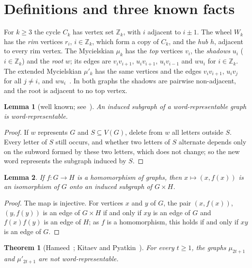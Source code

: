 \documentclass[11pt]{article}
\newtheorem{theorem}{Theorem}
\newtheorem{lemma}{Lemma}[section]
\theoremstyle{remark}
\newcommand{\Z}{\mathbb Z}
\begin{document}
\section{Definitions and three known facts}\label{sec:defs}
For $k\ge3$ the cycle $C_k$ has vertex set $\Z_k$, with $i$ adjacent to
$i\pm1$. The wheel $W_k$ has the \emph{rim} vertices $r_i$, $i\in\Z_k$,
which form a copy of $C_k$, and the \emph{hub} $h$, adjacent to every rim
vertex. The Mycielskian $\mu_k$ has the \emph{top} vertices $v_i$, the
\emph{shadows} $u_i$ ($i\in\Z_k$) and the \emph{root} $w$; its edges are
$v_iv_{i+1}$, $u_iv_{i+1}$, $u_iv_{i-1}$ and $wu_i$ for $i\in\Z_k$. The
extended Mycielskian $\mu'_k$ has the same vertices and the edges $v_iv_{i+1}$,
$u_iv_j$ for all $j\ne i$, and $wu_i$~\cite{alsh,kp}. In both graphs the
shadows are pairwise non-adjacent, and the root is adjacent to no top vertex.

\begin{lemma}[{well known; see~\cite{kl}}]\label{lem:hered}
An induced subgraph of a word-representable graph is word-representable.
\end{lemma}
\begin{proof}
If $w$ represents $G$ and $S\subseteq V(G)$, delete from $w$ all letters
outside $S$. Every letter of $S$ still occurs, and whether two letters of
$S$ alternate depends only on the subword formed by these two letters, which
does not change; so the new word represents the subgraph induced by $S$.
\end{proof}

\begin{lemma}\label{lem:graphhom}
If $f\colon G\to H$ is a homomorphism of graphs, then $x\mapsto(x,f(x))$ is an
isomorphism of $G$ onto an induced subgraph of $G\times H$.
\end{lemma}
\begin{proof}
The map is injective. For vertices $x$ and $y$ of $G$, the pair
$(x,f(x))$, $(y,f(y))$ is an edge of $G\times H$ if and only if $xy$ is an
edge of $G$ and $f(x)f(y)$ is an edge of $H$; as $f$ is a homomorphism, this
holds if and only if $xy$ is an edge of $G$.
\end{proof}

\begin{theorem}[{Hameed~\cite{hameed}; Kitaev and Pyatkin~\cite[Theorem~4 and Remark~5]{kp}}]\label{thm:kp}
For every $t\ge1$, the graphs $\mu_{2t+1}$ and $\mu'_{2t+1}$ are not
word-representable.
\end{theorem}
\end{document}
